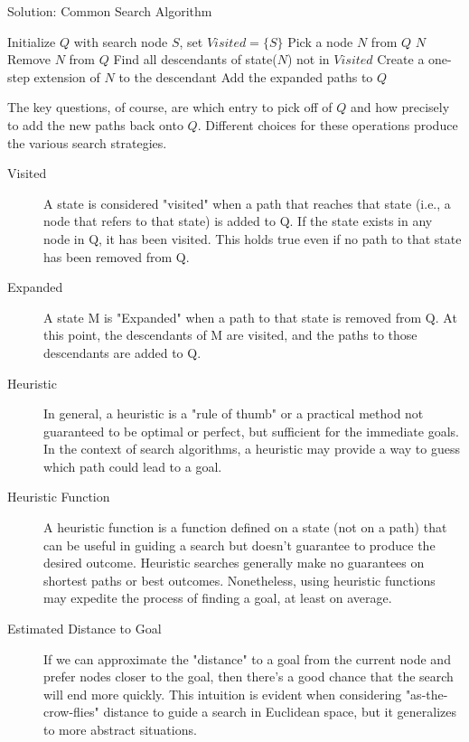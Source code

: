 \documentclass[a4paper,UKenglish,cleveref, autoref, thm-restate]{qlinhta}
\begin{document}
    \begin{algorithm}
        \caption{Solution: Common Search Algorithm}
        \begin{algorithmic}[1]
            \State Initialize $Q$ with search node $S$, set $Visited = \{S\}$
                \State Pick a node $N$ from $Q$
                    \State \Return $N$ 
                \EndIf
                \State Remove $N$ from $Q$
                \State Find all descendants of state($N$) not in $Visited$
                    \State Create a one-step extension of $N$ to the descendant
                \EndFor
                \State Add the expanded paths to $Q$
            \EndWhile
        \end{algorithmic}
    \end{algorithm}

    The key questions, of course, are which entry to pick off of $Q$ and how precisely to add the new paths back onto $Q$. Different choices for these operations produce the various search strategies.

    \begin{description}
        \item[Visited] A state is considered "visited" when a path that reaches that state (i.e., a node that refers to that state) is added to Q. If the state exists in any node in Q, it has been visited. This holds true even if no path to that state has been removed from Q.

        \item[Expanded] A state M is "Expanded" when a path to that state is removed from Q. At this point, the descendants of M are visited, and the paths to those descendants are added to Q.

        \item[Heuristic] In general, a heuristic is a "rule of thumb" or a practical method not guaranteed to be optimal or perfect, but sufficient for the immediate goals. In the context of search algorithms, a heuristic may provide a way to guess which path could lead to a goal.

        \item[Heuristic Function] A heuristic function is a function defined on a state (not on a path) that can be useful in guiding a search but doesn't guarantee to produce the desired outcome. Heuristic searches generally make no guarantees on shortest paths or best outcomes. Nonetheless, using heuristic functions may expedite the process of finding a goal, at least on average.

        \item[Estimated Distance to Goal] If we can approximate the "distance" to a goal from the current node and prefer nodes closer to the goal, then there's a good chance that the search will end more quickly. This intuition is evident when considering "as-the-crow-flies" distance to guide a search in Euclidean space, but it generalizes to more abstract situations.
    \end{description}
\end{document}
